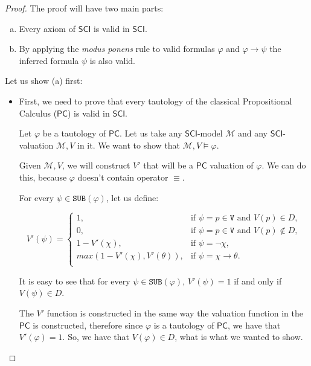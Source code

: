 \documentclass{article}
\theoremstyle{definition}
\theoremstyle{definition}
\theoremstyle{definition}
\theoremstyle{definition}
\theoremstyle{definition}
\newcommand*{\id}{\equiv}
\newcommand*{\ra}{\rightarrow}
\newcommand*{\V}{\texttt{V}}
\newcommand*{\SUB}{\texttt{SUB}}
\newcommand{\SCI}{$\mathsf{SCI}$\xspace}
\newcommand{\PC}{$\mathsf{PC}$\xspace}
\begin{document}
\begin{proof}
    The proof will have two main parts:
    \begin{enumerate}[(a)]
        \item Every axiom of \SCI is valid in \SCI.
        \item By applying the \emph{modus ponens} rule to valid formulas $\varphi$ and
              $\varphi \ra \psi$ the inferred formula $\psi$ is also valid.
    \end{enumerate}

    Let us show (a) first:
    \begin{itemize}
        \item First, we need to prove that every tautology of the classical Propositional
              Calculus (\PC) is valid in \SCI.

              Let $\varphi$ be a tautology of \PC. Let us take any \SCI-model $\mathcal{M}$
              and any \SCI-valuation $\mathcal{M}, V$ in it. We want to show that
              $\mathcal{M}, V \models \varphi$.

              Given $\mathcal{M}, V$, we will construct $V'$ that will be a \PC valuation of
              $\varphi$. We can do this, because $\varphi$ doesn't contain operator $\id$.

              For every $\psi \in \SUB(\varphi)$, let us define:

              $$
                  V'(\psi) = \begin{cases}
                      1,                           & \text{if } \psi = p \in \V \text{ and } V(p) \in D,      \\
                      0,                           & \text{if } \psi = p \in \V \text{ and } V(p) \not \in D, \\
                      1-V'(\chi),                  & \text{if } \psi = \lnot \chi,                            \\
                      max(1-V'(\chi), V'(\theta)), & \text{if } \psi = \chi \ra \theta.                       \\
                  \end{cases}
              $$

              It is easy to see that for every $\psi \in \SUB(\varphi)$, $V'(\psi) = 1$ if
              and only if $V(\psi) \in D$.

              The $V'$ function is constructed in the same way the valuation function in the
              \PC is constructed, therefore since $\varphi$ is a tautology of \PC, we have
              that $V'(\varphi) = 1$. So, we have that $V(\varphi) \in D$, what is what we
              wanted to show.


\end{itemize}
\end{proof}
\end{document}
